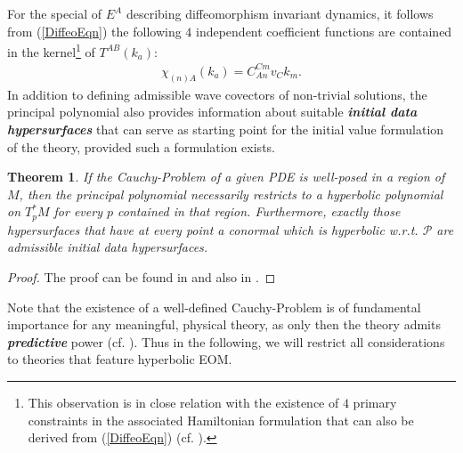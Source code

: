 \documentclass[%
preprint,
nofootinbib,
amsmath,amssymb,
aps,
prd,
floatfix,
]{revtex4-2}
\newtheorem{theorem}{Theorem}
\begin{document}
For the special of $E^A$ describing diffeomorphism invariant dynamics, it follows from (\ref{DiffeoEqn}) the following $4$ independent coefficient functions are contained in the kernel\footnote{This observation is in close relation with the existence of $4$ primary constraints in the associated Hamiltonian formulation that can also be derived from (\ref{DiffeoEqn}) (cf. \cite{TobiMaster}).}  of $T^{AB}(k_a)$: 
\begin{align}
   \chi_{(n)A}(k_a) =  C_{An}^{Cm}v_Ck_m.
\end{align}
In addition to defining admissible wave covectors of non-trivial solutions, the principal polynomial also provides information about suitable \textit{\textbf{initial data hypersurfaces}} that can serve as starting point for the initial value formulation of the theory, provided such a formulation exists.
\begin{theorem}
If the Cauchy-Problem of a given PDE is well-posed in a region of $M$, then the principal polynomial necessarily restricts to a hyperbolic polynomial on $T_p^{\ast}M$ for every $p$ contained in that region. Furthermore, exactly those hypersurfaces that have at every point a conormal which is hyperbolic w.r.t. $\mathcal{P}$ are admissible initial data hypersurfaces.
\end{theorem}
\begin{proof}
The proof can be found in \cite{Hormander1977} and also in \cite{Ivrii_1974}.
\end{proof}
Note that the existence of a well-defined Cauchy-Problem is of fundamental importance for any meaningful, physical theory, as only then the theory admits \textit{\textbf{predictive}} power (cf. \cite{Rivera}).  Thus in the following, we will restrict all considerations to theories that feature hyperbolic EOM.
\end{document}
